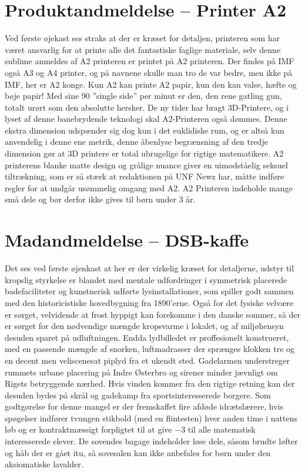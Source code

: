 \begin{minipage}[t]{100mm}
\vspace{1mm}
\section*{Produktandmeldelse -- Printer A2}
Ved første øjekast ses straks at der er kræset for detaljen, printeren som har været ansvarlig for at printe alle det fantastiske faglige materiale, selv denne sublime anmeldes af A2 printeren er printet på A2 printeren.  Der findes på IMF også A3 og A4 printer, og på navnene skulle man tro de var bedre, men ikke på IMF, her er A2 konge. Kun A2 kan printe A2 papir, kun den kan valse, hæfte og bøje papir! Med sine 90 ”single side” per minut er den, den rene gatling gun, totalt urørt som den absolutte hersker. De ny tider har bragt 3D-Printere, og i lyset af denne banebrydende teknologi skal A2-Printeren også dømmes. Denne ekstra dimension udspænder sig dog kun i det euklidiske rum, og er altså kun anvendelig i denne ene metrik, denne åbenlyse begrænsning af den tredje dimension gør at 3D printere er total ubrugelige for rigtige matematikere.  A2 printerens blanke matte design og grålige nuance giver en uimodståelig seksuel tiltrækning, som er så stærk at redaktionen på UNF Newz har, måtte indføre regler for at undgår usømmelig omgang med A2. 
A2 Printeren indeholde mange små dele og bør derfor ikke gives til børn under 3 år.

\vspace{1mm}
\section*{Madandmeldelse -- DSB-kaffe}
\vspace{2mm}

Det ses ved første øjenkast at her er der virkelig kræset for detaljerne, udstyr til kropslig styrkelse er blandet med mentale udfordringer i symmetrisk placerede badefaciliteter og kunstnerisk udførte lysinstallationer, som spiller godt sammen med den historicistiske hovedbygning fra 1890'erne. Også for det fysiske velvære er sørget, velvidende at frost hyppigt kan forekomme i den danske sommer, så der er sørget for den nødvendige mængde kropsvarme i lokalet, og af miljøhensyn desuden sparet på udluftningen.
Endda lydbilledet er proffesionelt konstrueret, med en passende mængde af snorken, luftmadrasser der sprænges klokken tre og en decent men veliscenesat piplyd fra et ukendt sted. Gadelarmen understreger rummets urbane placering på Indre Østerbro og sirener minder jævnligt om Rigets betryggende nærhed. Hvis vinden kommer fra den rigtige retning kan der desuden bydes på skrål og gadekamp fra sportsinteresserede borgere. Som godtgørelse for denne mangel er der fremskaffet fire afdøde idrætslærere, hvis spøgelser indfører tvungen stikbold (med en flintesten) hver anden time i nattens løb og er kontraktmæssigt forpligtet til at give $-3$ til alle matematisk interesserede elever. 
De sovendes bagage indeholder løse dele, såsom brudte løfter og håb der er gået itu, så sovesalen kan ikke anbefales for børn under den aksiomatiske lavalder.

\end{minipage}

